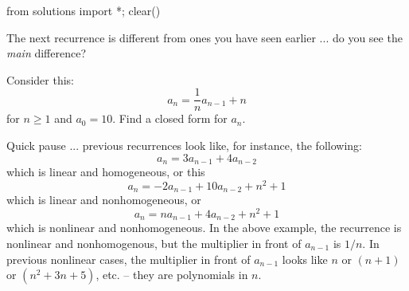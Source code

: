 \begin{python0}
from solutions import *; clear() 
\end{python0}

The next recurrence is different from ones you have seen earlier ...
do you see the \textit{main} difference?

\begin{eg}
Consider this:
\[
a_n = \frac{1}{n} a_{n-1} + n
\]
for $n \geq 1$ and $a_0 = 10$.
Find a closed form for $a_n$. 
\end{eg}

Quick pause ... previous recurrences look like, for instance, the following:
\[
a_n = 3 a_{n-1} + 4 a_{n-2} 
\]
which is linear and homogeneous,
or this
\[
a_n = -2 a_{n-1} + 10 a_{n-2} + n^2 + 1
\]
which is linear and nonhomogeneous,
or
\[
a_n = n a_{n-1} + 4 a_{n-2} + n^2 + 1
\]
which is nonlinear and nonhomogeneous.
In the above example, the recurrence is nonlinear and nonhomogenous, but
the multiplier in front of $a_{n-1}$ is $1/n$.
In previous nonlinear cases, the multiplier in front of $a_{n-1}$ looks like
$n$ or $(n + 1)$ or $(n^2 + 3n + 5)$, etc. -- they are polynomials in
$n$. 


